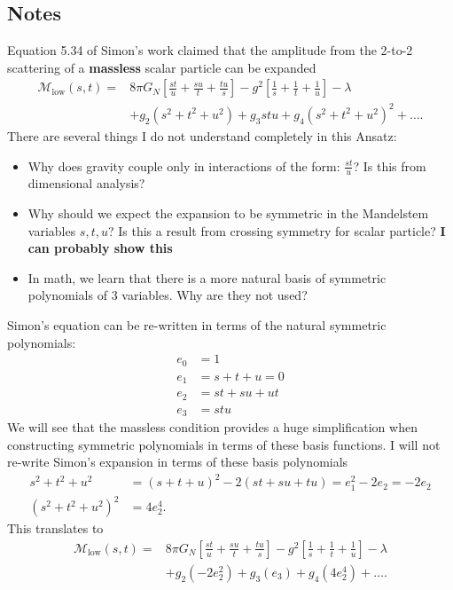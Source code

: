 \documentclass[11pt,a4paper]{article}
\begin{document}
\subsection*{Notes}
Equation 5.34 of Simon's work claimed that the amplitude from the 2-to-2 scattering of a \textbf{massless} scalar particle can be expanded
\begin{align*}
\mathcal{M}_{\mathrm{low}}(s, t)=& 8 \pi G_{N}\left[\frac{s t}{u}+\frac{s u}{t}+\frac{t u}{s}\right]-g^{2}\left[\frac{1}{s}+\frac{1}{t}+\frac{1}{u}\right]-\lambda \\
&+g_{2}\left(s^{2}+t^{2}+u^{2}\right)+g_{3} s t u+g_{4}\left(s^{2}+t^{2}+u^{2}\right)^{2}+\ldots.
\end{align*}
There are several things I do not understand completely in this Ansatz:
\begin{itemize}
	\item Why does gravity couple only in interactions of the form: $\frac{st}{u}$?  Is this from dimensional analysis?
	\item Why should we expect the expansion to be symmetric in the Mandelstem variables $s,t,u$?  Is this a result from crossing symmetry for scalar particle? \textbf{I can probably show this}
	\item In math, we learn that there is a more natural basis of symmetric polynomials of $3$ variables.  Why are they not used?
\end{itemize}
Simon's equation can be re-written in terms of the natural symmetric polynomials:
\begin{align*}
	e_0 & = 1\\
	e_1 & = s + t + u = 0\\
	e_2 & = st + su + ut\\
	e_3 & = stu
\end{align*}
We will see that the massless condition provides a huge simplification when constructing symmetric polynomials in terms of these basis functions.  I will not re-write Simon's expansion in terms of these basis polynomials
\begin{align*}
	s^2 + t^2 + u^2 & = (s+t+u)^2 - 2(st + su + tu) = e_1 ^2 -2e_2 = -2e_2\\
	(s^2 + t^2 + u^2 )^2 & = 4e_2 ^4.
\end{align*}
This translates to
\begin{align*}
\mathcal{M}_{\mathrm{low}}(s, t)=& 8 \pi G_{N}\left[\frac{s t}{u}+\frac{s u}{t}+\frac{t u}{s}\right]-g^{2}\left[\frac{1}{s}+\frac{1}{t}+\frac{1}{u}\right]-\lambda \\
&+g_{2}\left(-2e_2 ^2 \right)+g_{3} (e_3) +g_{4}\left(4e_2 ^4\right)+\ldots.
\end{align*}
\end{document}
